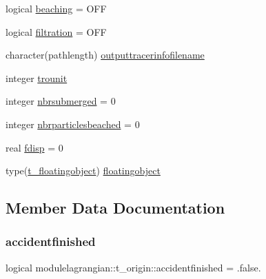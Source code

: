 \begin{DoxyCompactItemize}
logical \mbox{\hyperlink{structmodulelagrangian_1_1t__origin_a3018772e7c9c90b4bc189fbbee09168c}{beaching}} = O\+FF
\item 
logical \mbox{\hyperlink{structmodulelagrangian_1_1t__origin_a684f37c437b924db81317d66c3f78d33}{filtration}} = O\+FF
\item 
character(pathlength) \mbox{\hyperlink{structmodulelagrangian_1_1t__origin_a5bc15958a311b6fbd965697891d949e1}{outputtracerinfofilename}}
\item 
integer \mbox{\hyperlink{structmodulelagrangian_1_1t__origin_a52b9281aaeb55c16f1f71597bb8191a6}{trounit}}
\item 
integer \mbox{\hyperlink{structmodulelagrangian_1_1t__origin_abc93af2a5c61cc5e87cb5cf278e37951}{nbrsubmerged}} = 0
\item 
integer \mbox{\hyperlink{structmodulelagrangian_1_1t__origin_aaf902bdb0178ee0e138eeb42088a4a98}{nbrparticlesbeached}} = 0
\item 
real \mbox{\hyperlink{structmodulelagrangian_1_1t__origin_a4ebb8fb940cefc43039c7581708882cb}{fdisp}} = 0
\item 
type(\mbox{\hyperlink{structmodulelagrangian_1_1t__floatingobject}{t\+\_\+floatingobject}}) \mbox{\hyperlink{structmodulelagrangian_1_1t__origin_a42ddace83552716af70807baf2a19d28}{floatingobject}}
\end{DoxyCompactItemize}


\subsection{Member Data Documentation}
\mbox{\label{structmodulelagrangian_1_1t__origin_ac58aa8b4e149a168761bd82795fe2db6}} 
\subsubsection{\texorpdfstring{accidentfinished}{accidentfinished}}
{\footnotesize\ttfamily logical modulelagrangian\+::t\+\_\+origin\+::accidentfinished = .false.\hspace{0.3cm}{\ttfamily [private]}}

\mbox{\label{structmodulelagrangian_1_1t__origin_a1c55d44423a47672f41f82221bccca1f}} 
